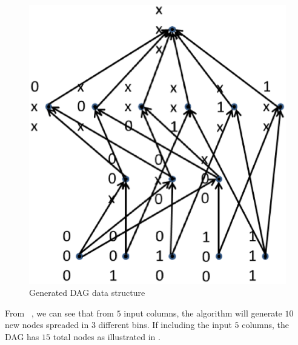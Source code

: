 \begin{figure}[!h]
\begin{minipage}[b]{0.5\linewidth}
\includegraphics[scale=0.5]{figures/dag.eps}
\caption{Generated {DAG} data structure}
\label{fig:dag}
\end{minipage}
\end{figure}

From ~, we can see that from $5$ input columns, the algorithm will
generate $10$ new nodes spreaded in $3$ different bins.  If including
the input $5$ columns, the {DAG} has $15$ total nodes as illustrated
in .
